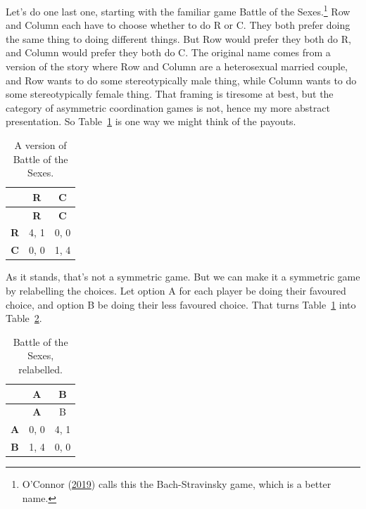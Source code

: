 \documentclass[
  12pt,
  letterpaper,
  DIV=11,
  numbers=noendperiod]{scrreprt}
\begin{document}
Let's do one last one, starting with the familiar game Battle of the
Sexes.\footnote{O'Connor (\protect\hyperlink{ref-OConnor2019}{2019})
  calls this the Bach-Stravinsky game, which is a better name.} Row and
Column each have to choose whether to do R or C. They both prefer doing
the same thing to doing different things. But Row would prefer they both
do R, and Column would prefer they both do C. The original name comes
from a version of the story where Row and Column are a heterosexual
married couple, and Row wants to do some stereotypically male thing,
while Column wants to do some stereotypically female thing. That framing
is tiresome at best, but the category of asymmetric coordination games
is not, hence my more abstract presentation. So
Table~\ref{tbl-bach-stravinsky} is one way we might think of the
payouts.

\hypertarget{tbl-bach-stravinsky}{}
\begin{longtable}[]{@{}ccc@{}}
\caption{\label{tbl-bach-stravinsky}A version of Battle of the
Sexes.}\tabularnewline
\toprule\noalign{}
& \textbf{R} & \textbf{C} \\
\midrule\noalign{}
\endfirsthead
\toprule\noalign{}
& \textbf{R} & \textbf{C} \\
\midrule\noalign{}
\endhead
\bottomrule\noalign{}
\endlastfoot
\textbf{R} & 4, 1 & 0, 0 \\
\textbf{C} & 0, 0 & 1, 4 \\
\end{longtable}

As it stands, that's not a symmetric game. But we can make it a
symmetric game by relabelling the choices. Let option A for each player
be doing their favoured choice, and option B be doing their less
favoured choice. That turns Table~\ref{tbl-bach-stravinsky} into
Table~\ref{tbl-bach-stravinsky-symmetric}.

\hypertarget{tbl-bach-stravinsky-symmetric}{}
\begin{longtable}[]{@{}ccc@{}}
\caption{\label{tbl-bach-stravinsky-symmetric}Battle of the Sexes,
relabelled.}\tabularnewline
\toprule\noalign{}
& \textbf{A} & B \\
\midrule\noalign{}
\endfirsthead
\toprule\noalign{}
& \textbf{A} & B \\
\midrule\noalign{}
\endhead
\bottomrule\noalign{}
\endlastfoot
\textbf{A} & 0, 0 & 4, 1 \\
\textbf{B} & 1, 4 & 0, 0 \\
\end{longtable}
\end{document}
